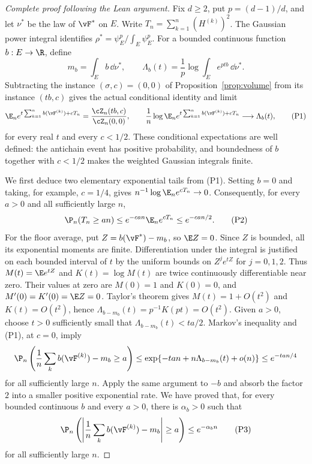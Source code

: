 \begin{proof}[Complete proof following the Lean argument]
Fix $d\ge2$, put $p=(d-1)/d$, and let $\nu^\ast$ be the law of
$\vF^\ast$ on $E$. Write $T_n=\sum_{k=1}^n(H^{(k)})^2$.
The Gaussian power integral identifies
$\rho^\ast=\psi_E^p/\int_E\psi_E^p$.
For a bounded continuous function $b:E\to\R$, define
\[
 m_b=\int_E b\,\dd\nu^\ast,
 \qquad
 \Lambda_b(t)=\frac1p\log\int_E e^{ptb}\,\dd\nu^\ast.
\]
Subtracting the instance $(\sigma,c)=(0,0)$ of
Proposition~\ref{prop:volume} from its instance $(tb,c)$ gives the actual
conditional identity and limit
\[
 \E_n e^{t\sum_{k=1}^n b(\vF^{(k)})+cT_n}
   =\frac{\cZ_n(tb,c)}{\cZ_n(0,0)},
 \qquad
 \frac1n\log\E_n
 e^{t\sum_{k=1}^n b(\vF^{(k)})+cT_n}
 \longrightarrow\Lambda_b(t),                 \tag{P1}
\]
for every real $t$ and every $c<1/2$. These conditional expectations are
well defined: the antichain event has positive probability, and boundedness
of $b$ together with $c<1/2$ makes the weighted Gaussian integrals finite.

We first deduce two elementary exponential tails from (P1). Setting $b=0$
and taking, for example, $c=1/4$, gives
$n^{-1}\log\E_n e^{cT_n}\to0$. Consequently, for every $a>0$ and all
sufficiently large $n$,
\[
 \P_n(T_n\ge an)
 \le e^{-can}\E_n e^{cT_n}
 \le e^{-can/2}.                              \tag{P2}
\]
For the floor average, put $Z=b(\vF^\ast)-m_b$, so $\E Z=0$. Since $Z$ is
bounded, all its exponential moments are finite. Differentiation under
the integral is justified on each bounded interval of $t$ by the
uniform bounds on $Z^j e^{tZ}$ for $j=0,1,2$. Thus $M(t)=\E e^{tZ}$
and $K(t)=\log M(t)$ are twice continuously differentiable near zero.
Their values at zero are $M(0)=1$ and $K(0)=0$, and
$M'(0)=K'(0)=\E Z=0$. Taylor's theorem gives
$M(t)=1+O(t^2)$ and $K(t)=O(t^2)$, hence
$\Lambda_{b-m_b}(t)=p^{-1}K(pt)=O(t^2)$.
Given $a>0$, choose $t>0$ sufficiently small that
$\Lambda_{b-m_b}(t)<ta/2$. Markov's inequality and (P1), at $c=0$, imply
\[
 \P_n\left(\frac1n\sum_k b(\vF^{(k)})-m_b\ge a\right)
 \le \exp\{-tan+n\Lambda_{b-m_b}(t)+o(n)\}
 \le e^{-tan/4}
\]
for all sufficiently large $n$. Apply the same argument to $-b$ and
absorb the factor $2$ into a smaller positive exponential rate. We have
proved that, for every bounded continuous $b$ and every $a>0$, there is
$\alpha_b>0$ such that
\[
 \P_n\left(\left|\frac1n\sum_k b(\vF^{(k)})-m_b\right|\ge a\right)
 \le e^{-\alpha_b n}                          \tag{P3}
\]
for all sufficiently large $n$.


\end{proof}
